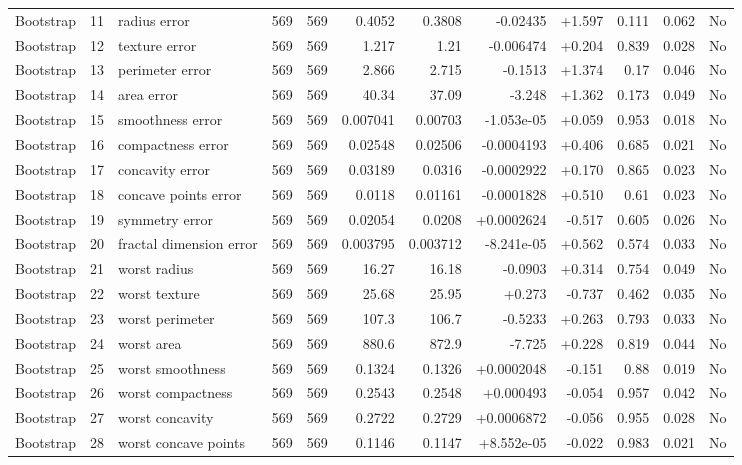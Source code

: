 \begin{landscape}
\begin{longtable}{@{}lrp{4.0cm}rrrrrrrrr@{}}
Bootstrap & 11 & radius error & 569 & 569 & 0.4052 & 0.3808 & -0.02435 & +1.597 & 0.111 & 0.062 & No \\
Bootstrap & 12 & texture error & 569 & 569 & 1.217 & 1.21 & -0.006474 & +0.204 & 0.839 & 0.028 & No \\
Bootstrap & 13 & perimeter error & 569 & 569 & 2.866 & 2.715 & -0.1513 & +1.374 & 0.17 & 0.046 & No \\
Bootstrap & 14 & area error & 569 & 569 & 40.34 & 37.09 & -3.248 & +1.362 & 0.173 & 0.049 & No \\
Bootstrap & 15 & smoothness error & 569 & 569 & 0.007041 & 0.00703 & -1.053e-05 & +0.059 & 0.953 & 0.018 & No \\
Bootstrap & 16 & compactness error & 569 & 569 & 0.02548 & 0.02506 & -0.0004193 & +0.406 & 0.685 & 0.021 & No \\
Bootstrap & 17 & concavity error & 569 & 569 & 0.03189 & 0.0316 & -0.0002922 & +0.170 & 0.865 & 0.023 & No \\
Bootstrap & 18 & concave points error & 569 & 569 & 0.0118 & 0.01161 & -0.0001828 & +0.510 & 0.61 & 0.023 & No \\
Bootstrap & 19 & symmetry error & 569 & 569 & 0.02054 & 0.0208 & +0.0002624 & -0.517 & 0.605 & 0.026 & No \\
Bootstrap & 20 & fractal dimension error & 569 & 569 & 0.003795 & 0.003712 & -8.241e-05 & +0.562 & 0.574 & 0.033 & No \\
Bootstrap & 21 & worst radius & 569 & 569 & 16.27 & 16.18 & -0.0903 & +0.314 & 0.754 & 0.049 & No \\
Bootstrap & 22 & worst texture & 569 & 569 & 25.68 & 25.95 & +0.273 & -0.737 & 0.462 & 0.035 & No \\
Bootstrap & 23 & worst perimeter & 569 & 569 & 107.3 & 106.7 & -0.5233 & +0.263 & 0.793 & 0.033 & No \\
Bootstrap & 24 & worst area & 569 & 569 & 880.6 & 872.9 & -7.725 & +0.228 & 0.819 & 0.044 & No \\
Bootstrap & 25 & worst smoothness & 569 & 569 & 0.1324 & 0.1326 & +0.0002048 & -0.151 & 0.88 & 0.019 & No \\
Bootstrap & 26 & worst compactness & 569 & 569 & 0.2543 & 0.2548 & +0.000493 & -0.054 & 0.957 & 0.042 & No \\
Bootstrap & 27 & worst concavity & 569 & 569 & 0.2722 & 0.2729 & +0.0006872 & -0.056 & 0.955 & 0.028 & No \\
Bootstrap & 28 & worst concave points & 569 & 569 & 0.1146 & 0.1147 & +8.552e-05 & -0.022 & 0.983 & 0.021 & No \\

\end{longtable}
\end{landscape}
